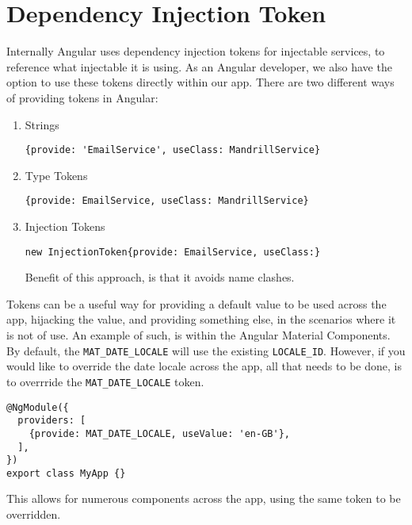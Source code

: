 \section{ Dependency Injection Token }
Internally Angular uses dependency injection tokens for injectable services, to
reference what injectable it is using. As an Angular developer, we also have the 
option to use these tokens directly within our app. There are two different 
ways of providing tokens in Angular:
\begin{enumerate}
  \item Strings 
\begin{lstlisting}  
{provide: 'EmailService', useClass: MandrillService}
\end{lstlisting}  
  \item Type Tokens
\begin{lstlisting}    
{provide: EmailService, useClass: MandrillService}
\end{lstlisting}  
  \item Injection Tokens
\begin{lstlisting}   
new InjectionToken{provide: EmailService, useClass:} 
\end{lstlisting}   
Benefit of this approach, is that it avoids name clashes.
\end{enumerate}

Tokens can be a useful way for providing a default value to be used across the 
app, hijacking the value, and providing something else, in the 
scenarios where it is not of use. An example of such, is within the Angular 
Material Components. By default, the \lstinline{MAT_DATE_LOCALE} will use 
the existing \lstinline{LOCALE_ID}. However, if you would like to override the 
date locale across the app, all that needs to be done, is to overrride the 
\lstinline{MAT_DATE_LOCALE} token. 
\begin{lstlisting}
@NgModule({
  providers: [
    {provide: MAT_DATE_LOCALE, useValue: 'en-GB'},
  ],
})
export class MyApp {}
\end{lstlisting}

This allows for numerous components across the app, using the same token to 
be overridden. 


